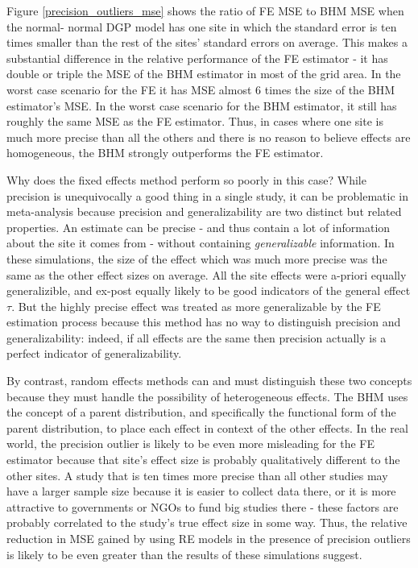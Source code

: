 \documentclass[12pt]{article}
\begin{document}
Figure \ref{precision_outliers_mse} shows the ratio of FE MSE to BHM MSE when the  normal- normal DGP model has one site in which the standard error is ten times smaller than the rest of the sites' standard errors on average. This makes a substantial difference in the relative performance of the FE estimator - it has double or triple the MSE of the BHM estimator in most of the grid area. In the worst case scenario for the FE it has MSE almost 6 times the size of the BHM estimator's MSE. In the worst case scenario for the BHM estimator, it still has roughly the same MSE as the FE estimator. Thus, in cases where one site is much more precise than all the others and there is no reason to believe effects are homogeneous, the BHM strongly outperforms the FE estimator.

Why does the fixed effects method perform so poorly in this case? While precision is unequivocally a good thing in a single study, it can be problematic in meta-analysis because precision and generalizability are two distinct but related properties. An estimate can be precise - and thus contain a lot of information about the site it comes from - without containing \emph{generalizable} information. In these simulations, the size of the effect which was much more precise was the same as the other effect sizes on average. All the site effects were a-priori equally generalizible, and ex-post equally likely to be good indicators of the general effect $\tau$. But the highly precise effect was treated as more generalizable by the FE estimation process because this method has no way to distinguish precision and generalizability: indeed, if all effects are the same then precision actually is a perfect indicator of generalizability. 

By contrast, random effects methods can and must distinguish these two concepts because they must handle the possibility of heterogeneous effects. The BHM uses the concept of a parent distribution, and specifically the functional form of the parent distribution, to place each effect in context of the other effects. In the real world, the precision outlier is likely to be even more misleading for the FE estimator because that site's effect size is probably qualitatively different to the other sites. A study that is ten times more precise than all other studies may have a larger sample size because it is easier to collect data there, or it is more attractive to governments or NGOs to fund big studies there - these factors are probably correlated to the study's true effect size in some way. Thus, the relative reduction in MSE gained by using RE models in the presence of precision outliers is likely to be even greater than the results of these simulations suggest. 
\end{document}
